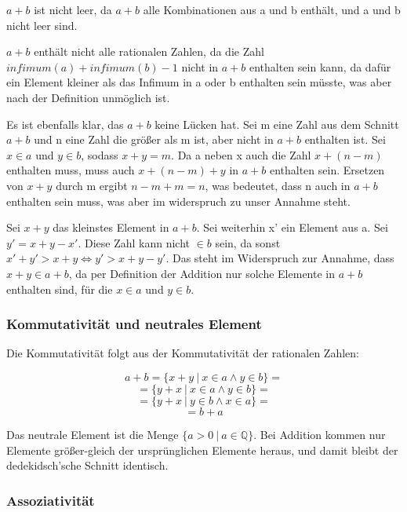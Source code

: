 \documentclass[12pt]{article}
\begin{document}
    $a + b$ ist nicht leer, da $a + b$ alle Kombinationen aus a und b enthält, und a und b nicht leer sind.

    $a + b$ enthält nicht alle rationalen Zahlen, da die Zahl $infimum(a) + infimum(b) - 1$ nicht in $a + b$
    enthalten sein kann, da dafür ein Element kleiner als das Infimum in a oder b enthalten sein müsste, was
    aber nach der Definition unmöglich ist.

    Es ist ebenfalls klar, das $a + b$ keine Lücken hat.
    Sei m eine Zahl aus dem Schnitt $a + b$ und n eine Zahl die größer als m ist, aber nicht in $a + b$ enthalten ist.
    Sei $x \in a$ und $y \in b$, sodass $x + y = m$. Da a neben x auch die Zahl $x + (n - m)$ enthalten muss,
    muss auch $x + (n - m) + y$ in $a + b$ enthalten sein. Ersetzen von $x + y$ durch m ergibt $n - m + m = n$,
    was bedeutet, dass n auch in $a + b$ enthalten sein muss, was aber im widerspruch zu unser Annahme steht.

    Sei $x + y$ das kleinstes Element in $a + b$. Sei weiterhin x' ein Element aus a.
    Sei $y' = x + y - x'$. Diese Zahl kann nicht $\in b$ sein, da sonst $x' + y' > x + y \Leftrightarrow y' > x + y - y'$.
    Das steht im Widerspruch zur Annahme, dass $x + y \in a + b$, da per Definition der Addition nur solche Elemente
    in $a + b$ enthalten sind, für die $x \in a$ und $y \in b$.

    \subsubsection{Kommutativität und neutrales Element}

    Die Kommutativität folgt aus der Kommutativität der rationalen Zahlen:

    \[a + b = \{x + y \mspace{4mu} | \mspace{4mu} x \in a \land y \in b\} =\]
    \[= \{y + x \mspace{4mu} | \mspace{4mu} x \in a \land y \in b\} =\]
    \[= \{y + x \mspace{4mu} | \mspace{4mu} y \in b \land x \in a\} =\]
    \[= b + a\]

    Das neutrale Element ist die Menge $\{a > 0 \mspace{4mu} | \mspace{4mu} a \in \mathbb{Q}\}$.
    Bei Addition kommen nur Elemente größer-gleich der ursprünglichen Elemente heraus, und damit bleibt
    der dedekidsch'sche Schnitt identisch.

    \subsubsection{Assoziativität}
\end{document}

